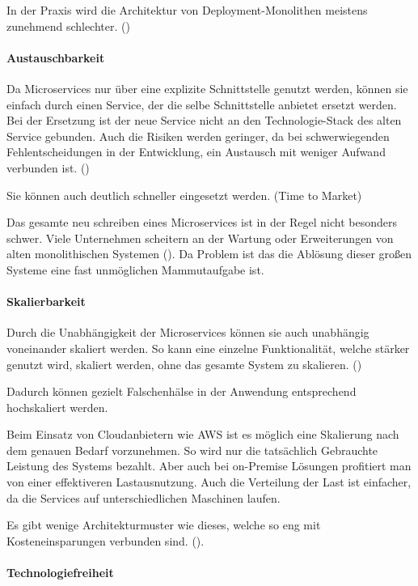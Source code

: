 In der Praxis wird die Architektur von Deployment-Monolithen meistens zunehmend schlechter. (\cite[S. 3]{wolffMicroservices2018})

\paragraph{Austauschbarkeit}
Da Microservices nur über eine explizite Schnittstelle genutzt werden, können sie einfach durch einen Service, der die selbe Schnittstelle anbietet ersetzt werden. Bei der Ersetzung ist der neue Service nicht an den Technologie-Stack des alten Service gebunden. Auch die Risiken werden geringer, da bei schwerwiegenden Fehlentscheidungen in der Entwicklung, ein Austausch mit weniger Aufwand verbunden ist. (\cite[S. 4]{wolffMicroservices2018})

Sie können auch deutlich schneller eingesetzt werden. (Time to Market)

Das gesamte neu schreiben eines Microservices ist in der Regel nicht besonders schwer. Viele Unternehmen scheitern an der Wartung oder Erweiterungen von alten monolithischen Systemen (\cite[S. 29]{newmanMicroservices2015}). Da Problem ist das die Ablösung dieser großen Systeme eine fast unmöglichen Mammutaufgabe ist.

\paragraph{Skalierbarkeit}
Durch die Unabhängigkeit der Microservices können sie auch unabhängig voneinander skaliert werden. So kann eine einzelne Funktionalität, welche stärker genutzt wird, skaliert werden, ohne das gesamte System zu skalieren. (\cite[S. 5]{wolffMicroservices2018})

Dadurch können gezielt Falschenhälse in der Anwendung entsprechend hochskaliert werden.

Beim Einsatz von Cloudanbietern wie AWS ist es möglich eine Skalierung nach dem genauen Bedarf vorzunehmen. So wird nur die tatsächlich Gebrauchte Leistung des Systems bezahlt. Aber auch bei on-Premise Lösungen profitiert man von einer effektiveren Lastausnutzung. Auch die Verteilung der Last ist einfacher, da die Services auf unterschiedlichen Maschinen laufen. 

Es gibt wenige Architekturmuster wie dieses, welche so eng mit Kosteneinsparungen verbunden sind. (\cite[S. 27]{newmanMicroservices2015}).

\paragraph{Technologiefreiheit}

